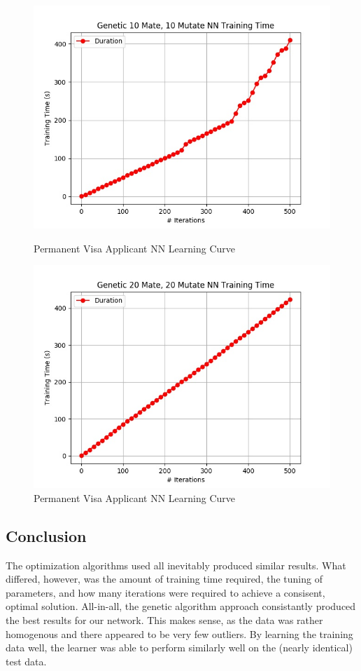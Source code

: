 \documentclass[h]{article}
\begin{document}
 \begin{figure}[H]
      \includegraphics[width=1\textwidth,keepaspectratio]{genetic_10_mate,_10_mutate_nn_time.jpg} 
      \caption*{Permanent Visa Applicant NN Learning Curve} 
   \endminipage\hfill
      \includegraphics[width=1\textwidth,keepaspectratio]{genetic_20_mate,_20_mutate_nn_time.jpg} 
      \caption*{Permanent Visa Applicant NN Learning Curve} 
   \endminipage\hfill
\end{figure}


\subsection*{ Conclusion}  
The optimization algorithms used all inevitably produced similar results.  What 
differed, however, was the amount of training time required, the tuning of 
parameters, and how many iterations were required to achieve a consisent, 
optimal solution.  All-in-all, the genetic algorithm approach consistantly produced 
the best results for our network.  This makes sense, as the data was rather 
homogenous and there appeared to be very few outliers.  By learning the training 
data well, the learner was able to perform similarly well on the (nearly identical) 
test data.
\end{document}
